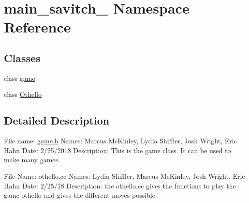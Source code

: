 \hypertarget{namespacemain__savitch__14}{}\section{main\+\_\+savitch\+\_ Namespace Reference}
\label{namespacemain__savitch__14}
\subsection*{Classes}
\begin{DoxyCompactItemize}
\item 
class \hyperlink{classmain__savitch__14_1_1game}{game}
\item 
class \hyperlink{classmain__savitch__14_1_1Othello}{Othello}
\end{DoxyCompactItemize}


\subsection{Detailed Description}
File name\+: \hyperlink{game_8h_source}{game.\+h} Names\+: Marcus Mc\+Kinley, Lydia Shiffler, Josh Wright, Eric Hahn Date\+: 2/25/2018 Description\+: This is the game class. It can be used to make many games.

File Name\+: othello.\+cc Names\+: Lydia Shiffler, Marcus Mc\+Kinley, Josh Wright, Eric Hahn Date\+: 2/25/18 Description\+: the othello.\+cc gives the functions to play the game othello and gives the different moves possible 
